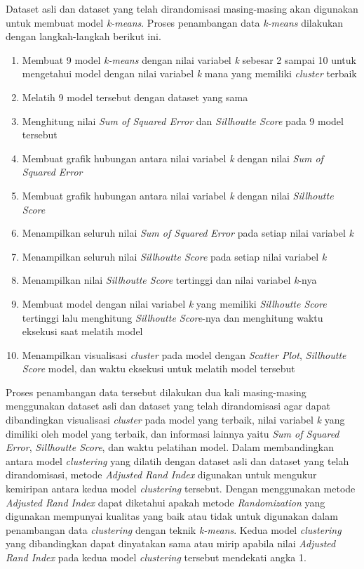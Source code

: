 Dataset asli dan dataset yang telah dirandomisasi masing-masing akan digunakan untuk membuat model \textit{k-means}. Proses penambangan data \textit{k-means} dilakukan dengan langkah-langkah berikut ini.
\begin{enumerate}
    \item Membuat 9 model \textit{k-means} dengan nilai variabel \textit{k} sebesar 2 sampai 10 untuk mengetahui model dengan nilai variabel \textit{k} mana yang memiliki \textit{cluster} terbaik
    \item Melatih 9 model tersebut dengan dataset yang sama
    \item Menghitung nilai \textit{Sum of Squared Error} dan \textit{Sillhoutte Score} pada 9 model tersebut
    \item Membuat grafik hubungan antara nilai variabel \textit{k} dengan nilai \textit{Sum of Squared Error}
    \item Membuat grafik hubungan antara nilai variabel \textit{k} dengan nilai \textit{Sillhoutte Score}
    \item Menampilkan seluruh nilai \textit{Sum of Squared Error} pada setiap nilai variabel \textit{k}
    \item Menampilkan seluruh nilai \textit{Sillhoutte Score} pada setiap nilai variabel \textit{k}
    \item Menampilkan nilai \textit{Sillhoutte Score} tertinggi dan nilai variabel \textit{k}-nya
    \item Membuat model dengan nilai variabel \textit{k} yang memiliki \textit{Sillhoutte Score} tertinggi lalu menghitung \textit{Sillhoutte Score}-nya dan menghitung waktu eksekusi saat melatih model
    \item Menampilkan visualisasi \textit{cluster} pada model dengan \textit{Scatter Plot}, \textit{Sillhoutte Score} model, dan waktu eksekusi untuk melatih model tersebut
\end{enumerate}
Proses penambangan data tersebut dilakukan dua kali masing-masing menggunakan dataset asli dan dataset yang telah dirandomisasi agar dapat dibandingkan visualisasi \textit{cluster} pada model yang terbaik, nilai variabel \textit{k} yang dimiliki oleh model yang terbaik, dan informasi lainnya yaitu \textit{Sum of Squared Error}, \textit{Sillhoutte Score}, dan waktu pelatihan model. Dalam membandingkan antara model \textit{clustering} yang dilatih dengan dataset asli dan dataset yang telah dirandomisasi, metode \textit{Adjusted Rand Index} digunakan untuk mengukur kemiripan antara kedua model \textit{clustering} tersebut. Dengan menggunakan metode \textit{Adjusted Rand Index} dapat diketahui apakah metode \textit{Randomization} yang digunakan mempunyai kualitas yang baik atau tidak untuk digunakan dalam penambangan data \textit{clustering} dengan teknik \textit{k-means}. Kedua model \textit{clustering} yang dibandingkan dapat dinyatakan sama atau mirip apabila nilai \textit{Adjusted Rand Index} pada kedua model \textit{clustering} tersebut mendekati angka 1.

